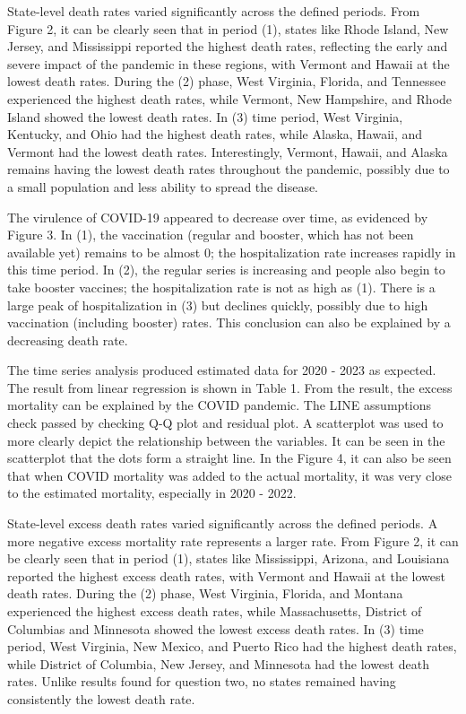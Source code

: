 \documentclass[
  letterpaper,
  DIV=11,
  numbers=noendperiod]{scrartcl}
\begin{document}
State-level death rates varied significantly across the defined periods.
From Figure 2, it can be clearly seen that in period (1), states like
Rhode Island, New Jersey, and Mississippi reported the highest death
rates, reflecting the early and severe impact of the pandemic in these
regions, with Vermont and Hawaii at the lowest death rates. During the
(2) phase, West Virginia, Florida, and Tennessee experienced the highest
death rates, while Vermont, New Hampshire, and Rhode Island showed the
lowest death rates. In (3) time period, West Virginia, Kentucky, and
Ohio had the highest death rates, while Alaska, Hawaii, and Vermont had
the lowest death rates. Interestingly, Vermont, Hawaii, and Alaska
remains having the lowest death rates throughout the pandemic, possibly
due to a small population and less ability to spread the disease.

The virulence of COVID-19 appeared to decrease over time, as evidenced
by Figure 3. In (1), the vaccination (regular and booster, which has not
been available yet) remains to be almost 0; the hospitalization rate
increases rapidly in this time period. In (2), the regular series is
increasing and people also begin to take booster vaccines; the
hospitalization rate is not as high as (1). There is a large peak of
hospitalization in (3) but declines quickly, possibly due to high
vaccination (including booster) rates. This conclusion can also be
explained by a decreasing death rate.

The time series analysis produced estimated data for 2020 - 2023 as
expected. The result from linear regression is shown in Table 1. From
the result, the excess mortality can be explained by the COVID pandemic.
The LINE assumptions check passed by checking Q-Q plot and residual
plot. A scatterplot was used to more clearly depict the relationship
between the variables. It can be seen in the scatterplot that the dots
form a straight line. In the Figure 4, it can also be seen that when
COVID mortality was added to the actual mortality, it was very close to
the estimated mortality, especially in 2020 - 2022.~

State-level excess death rates varied significantly across the defined
periods. A more negative excess mortality rate represents a larger rate.
From Figure 2, it can be clearly seen that in period (1), states like
Mississippi, Arizona, and Louisiana reported the highest excess death
rates, with Vermont and Hawaii at the lowest death rates. During the (2)
phase, West Virginia, Florida, and Montana experienced the highest
excess death rates, while Massachusetts, District of Columbias and
Minnesota showed the lowest excess death rates. In (3) time period, West
Virginia, New Mexico, and Puerto Rico had the highest death rates, while
District of Columbia, New Jersey, and Minnesota had the lowest death
rates. Unlike results found for question two, no states remained having
consistently the lowest death rate.
\end{document}
